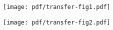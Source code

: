 \documentclass{article}
\begin{document}
\begin{figure}
    \begin{subfigure}[h]{0.5\linewidth}
    \texttt{[image: pdf/transfer-fig1.pdf]}
    \end{subfigure}
    \hfill
    \begin{subfigure}[h]{0.5\linewidth}
    \texttt{[image: pdf/transfer-fig2.pdf]}
    \end{subfigure}
    \end{figure}
\end{document}
